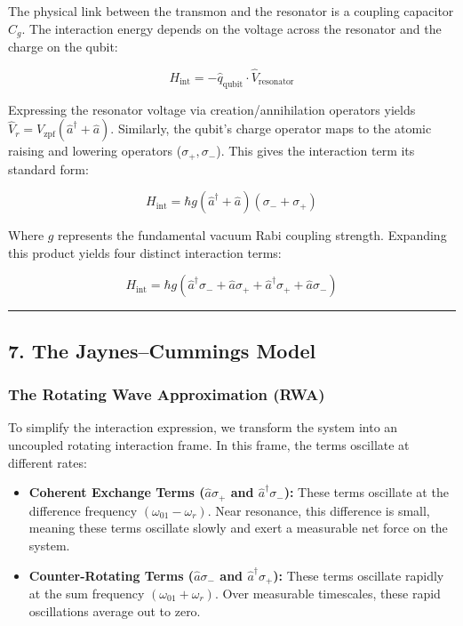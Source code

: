 \documentclass[
]{article}
\providecommand{\tightlist}{%
  \setlength{\itemsep}{0pt}\setlength{\parskip}{0pt}}
\begin{document}
The physical link between the transmon and the resonator is a coupling
capacitor \(C_g\). The interaction energy depends on the voltage across
the resonator and the charge on the qubit:

\[H_{\text{int}} = - \hat{q}_{\text{qubit}} \cdot \hat{V}_{\text{resonator}}\]

Expressing the resonator voltage via creation/annihilation operators
yields \(\hat{V}_r = V_{\text{zpf}}(\hat{a}^\dagger + \hat{a})\).
Similarly, the qubit's charge operator maps to the atomic raising and
lowering operators (\(\sigma_+, \sigma_-\)). This gives the interaction
term its standard form:

\[H_{\text{int}} = \hbar g (\hat{a}^\dagger + \hat{a})(\sigma_- + \sigma_+)\]

Where \(g\) represents the fundamental vacuum Rabi coupling strength.
Expanding this product yields four distinct interaction terms:

\[H_{\text{int}} = \hbar g \left( \hat{a}^\dagger \sigma_- + \hat{a} \sigma_+ + \hat{a}^\dagger \sigma_+ + \hat{a} \sigma_- \right)\]

\begin{center}\rule{0.5\linewidth}{0.5pt}\end{center}

\subsection{7. The Jaynes--Cummings
Model}\label{the-jaynescummings-model}

\subsubsection{The Rotating Wave Approximation
(RWA)}\label{the-rotating-wave-approximation-rwa}

To simplify the interaction expression, we transform the system into an
uncoupled rotating interaction frame. In this frame, the terms oscillate
at different rates:

\begin{itemize}
\tightlist
\item
  \textbf{Coherent Exchange Terms (\(\hat{a} \sigma_+\) and
  \(\hat{a}^\dagger \sigma_-\)):} These terms oscillate at the
  difference frequency \((\omega_{01} - \omega_r)\). Near resonance,
  this difference is small, meaning these terms oscillate slowly and
  exert a measurable net force on the system.
\item
  \textbf{Counter-Rotating Terms (\(\hat{a} \sigma_-\) and
  \(\hat{a}^\dagger \sigma_+\)):} These terms oscillate rapidly at the
  sum frequency \((\omega_{01} + \omega_r)\). Over measurable
  timescales, these rapid oscillations average out to zero.
\end{itemize}
\end{document}
